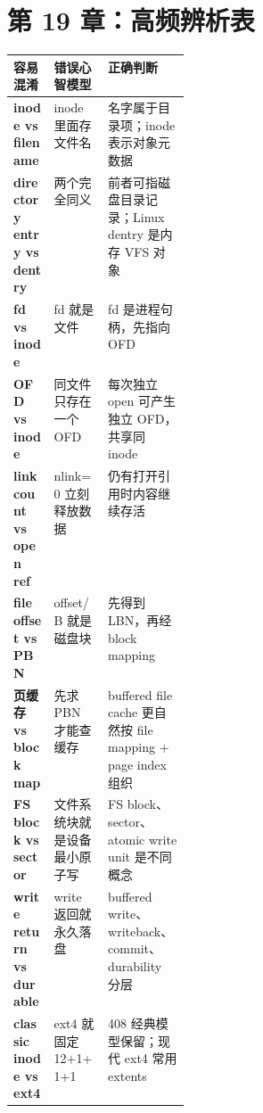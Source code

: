 \documentclass[11pt,a4paper]{ctexart}
\begin{document}
\section{第 19 章：高频辨析表}
\begin{center}
\small
\begin{tabularx}{\linewidth}{>{\bfseries}p{0.23\linewidth} X X}
\toprule
容易混淆 & 错误心智模型 & 正确判断 \\
\midrule
inode vs filename & inode 里面存文件名 & 名字属于目录项；inode 表示对象元数据 \\
directory entry vs dentry & 两个完全同义 & 前者可指磁盘目录记录；Linux dentry 是内存 VFS 对象 \\
fd vs inode & fd 就是文件 & fd 是进程句柄，先指向 OFD \\
OFD vs inode & 同文件只存在一个 OFD & 每次独立 open 可产生独立 OFD，共享同 inode \\
link count vs open ref & nlink=0 立刻释放数据 & 仍有打开引用时内容继续存活 \\
file offset vs PBN & offset/B 就是磁盘块 & 先得到 LBN，再经 block mapping \\
页缓存 vs block map & 先求 PBN 才能查缓存 & buffered file cache 更自然按 file mapping + page index 组织 \\
FS block vs sector & 文件系统块就是设备最小原子写 & FS block、sector、atomic write unit 是不同概念 \\
write return vs durable & write 返回就永久落盘 & buffered write、writeback、commit、durability 分层 \\
classic inode vs ext4 & ext4 就固定 12+1+1+1 & 408 经典模型保留；现代 ext4 常用 extents \\
\bottomrule
\end{tabularx}
\end{center}
\end{document}
